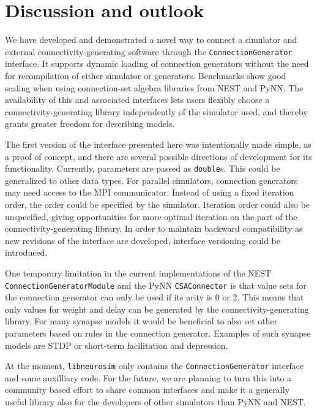 \documentclass{frontiersSCNS} %
\begin{document}

\section{Discussion and outlook}

We have developed and demonstrated a novel way to connect a simulator
and external connectivity-generating software through the
\verb|ConnectionGenerator| interface. It supports dynamic loading of
connection generators without the need for recompilation of either
simulator or generators. Benchmarks show good scaling when using
connection-set algebra libraries from NEST and PyNN. The availability
of this and associated interfaces lets users flexibly choose a
connectivity-generating library independently of the simulator used,
and thereby grants greater freedom for describing models.

The first version of the interface presented here was intentionally
made simple, as a proof of concept, and there are several possible
directions of development for its functionality. Currently, parameters
are passed as \verb|double|s. This could be generalized to other data
types.  For parallel simulators, connection generators may need access
to the MPI communicator.  Instead of using a fixed iteration order,
the order could be specified by the simulator. Iteration order could
also be unspecified, giving opportunities for more optimal iteration
on the part of the connectivity-generating library.  In order to
maintain backward compatibility as new revisions of the interface are
developed, interface versioning could be introduced.

One temporary limitation in the current implementations of the NEST
\verb|ConnectionGeneratorModule| and the PyNN \verb|CSAConnector| is
that value sets for the connection generator can only be used if its
arity is 0 or 2. This means that only values for weight and delay can
be generated by the connectivity-generating library. For many synapse
models it would be beneficial to also set other parameters based on
rules in the connection generator. Examples of such synapse models are
STDP or short-term facilitation and depression.

At the moment, \verb|libneurosim| only contains the
\verb|ConnectionGenerator| interface and some auxilliary code. For the
future, we are planning to turn this into a community based effort to
share common interfaces and make it a generally useful library also
for the developers of other simulators than PyNN and NEST.
\end{document}
